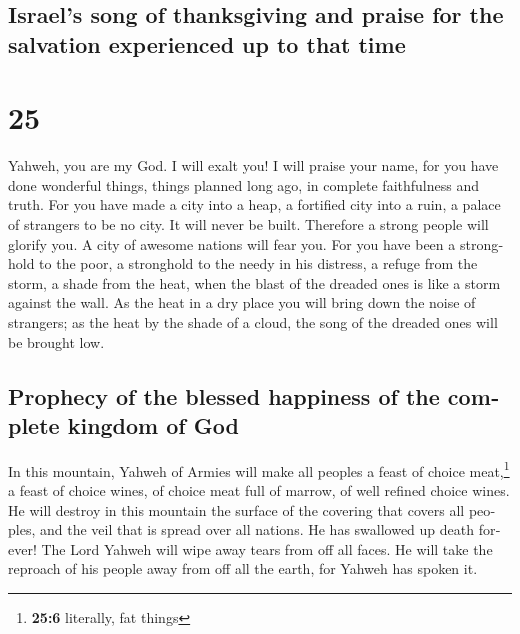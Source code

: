 \begin{paracol}{2}
\begin{otherlanguage}{english}
\hypertarget{israels-song-of-thanksgiving-and-praise-for-the-salvation-experienced-up-to-that-time}{%
\subsection{Israel's song of thanksgiving and praise for the salvation
experienced up to that
time}\label{israels-song-of-thanksgiving-and-praise-for-the-salvation-experienced-up-to-that-time}}

\hypertarget{section-49}{%
\section{25}\label{section-49}}

 Yahweh, you are my God. I will exalt you! I will praise
your name, for you have done wonderful things, things planned long ago,
in complete faithfulness and truth.  For you have made a
city into a heap, a fortified city into a ruin, a palace of strangers to
be no city. It will never be built.  Therefore a strong
people will glorify you. A city of awesome nations will fear you.
 For you have been a stronghold to the poor, a stronghold
to the needy in his distress, a refuge from the storm, a shade from the
heat, when the blast of the dreaded ones is like a storm against the
wall.  As the heat in a dry place you will bring down the
noise of strangers; as the heat by the shade of a cloud, the song of the
dreaded ones will be brought low.

\hypertarget{prophecy-of-the-blessed-happiness-of-the-complete-kingdom-of-god}{%
\subsection{Prophecy of the blessed happiness of the complete kingdom of
God}\label{prophecy-of-the-blessed-happiness-of-the-complete-kingdom-of-god}}

 In this mountain, Yahweh of Armies will make all peoples
a feast of choice meat,\footnote{\textbf{25:6} literally, fat things} a
feast of choice wines, of choice meat full of marrow, of well refined
choice wines.  He will destroy in this mountain the
surface of the covering that covers all peoples, and the veil that is
spread over all nations.  He has swallowed up death
forever! The Lord Yahweh will wipe away tears from off all faces. He
will take the reproach of his people away from off all the earth, for
Yahweh has spoken it.


\end{otherlanguage}
\end{paracol}
